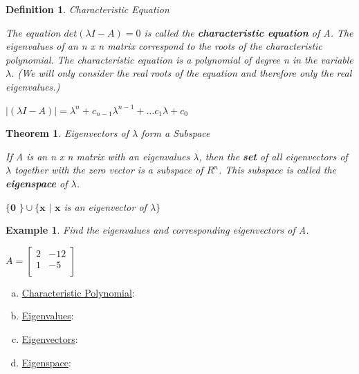 \documentclass[12pt]{article}
\newtheorem{thm}{Theorem}
\newtheorem{dfn}{Definition}
\newtheorem{ex}{Example}
\newcommand{\tbf}{\textbf}
\begin{document}
\begin{dfn} Characteristic Equation

The equation $det(\lambda I - A) = 0$ is called the \tbf{characteristic equation} of A. The eigenvalues of an n x n matrix correspond to the roots of the characteristic polynomial. The characteristic equation is a polynomial of degree n in the variable $\lambda$. (We will only consider the real roots of the equation and therefore only the real eigenvalues.)

\begin{center}
$\lvert (\lambda I - A) \rvert = \lambda^n + c_{n-1}\lambda^{n-1} + \ldots c_1\lambda + c_0$
\end{center}

\end{dfn}
\pagebreak
\begin{thm} Eigenvectors of $\lambda$ form a Subspace


If A is an n x n matrix with an eigenvalues $\lambda$, then the \tbf{set} of all eigenvectors of $\lambda$ together with the zero vector is a subspace of $R^n$. This subspace is called the \tbf{eigenspace} of $\lambda$.

\begin{center}
$\{ \tbf{0 } \} \cup \{ \tbf{x } \lvert \tbf{ x}$ is an eigenvector of $\lambda\}$
\end{center}



\end{thm}




\pagebreak
\begin{ex} 

Find the eigenvalues and corresponding eigenvectors of A.

\begin{center}
$A = \begin{bmatrix}
2	&	-12	\\
1	&	-5	\\
\end{bmatrix}$
\end{center}

\end{ex}

\begin{enumerate}[a)]
\item
\underline{Characteristic Polynomial}:

\vfill

\item
\underline{Eigenvalues}:

\vfill

\item
\underline{Eigenvectors}:

\vfill


\item
\underline{Eigenspace}:
\vfill

\end{enumerate}
\end{document}
